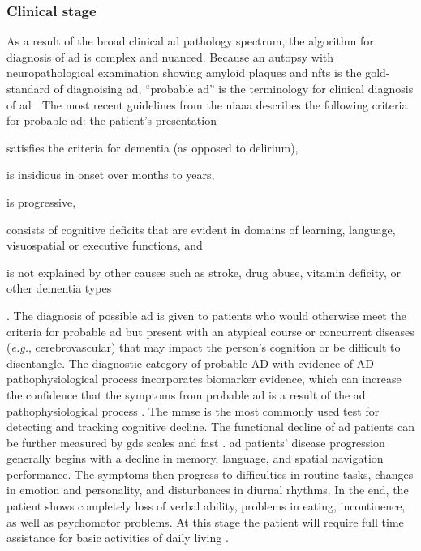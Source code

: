 \subsubsection{Clinical stage}

As a result of the broad clinical \gls{ad} pathology spectrum, the algorithm for diagnosis of \gls{ad} is complex and nuanced. Because an autopsy with neuropathological examination showing amyloid plaques and \gls{nft}s is the gold-standard of diagnoising \gls{ad}, ``probable \gls{ad}'' is the terminology for clinical diagnosis of \gls{ad} \citep{hyman12}. The most recent guidelines from the \gls{niaaa} describes the following criteria for probable \gls{ad}: the patient's presentation 
\begin{enumerate*}[label={\alph*)}, font={\bfseries}]
    \item satisfies the criteria for dementia (as opposed to delirium), 
    \item is insidious in onset over months to years, 
    \item is progressive,
    \item consists of cognitive deficits that are evident in domains of learning, language, visuospatial or executive functions, and 
    \item is not explained by other causes such as stroke, drug abuse, vitamin deficity, or other dementia types
\end{enumerate*} \citep{mckhann11}.
The diagnosis of possible \gls{ad} is given to patients who would otherwise meet the criteria for probable \gls{ad} but present with an atypical course or concurrent diseases (\textit{e.g.}, cerebrovascular) that may impact the person's cognition or be difficult to disentangle. The diagnostic category of probable AD with evidence of AD pathophysiological process incorporates biomarker evidence, which can increase the confidence that the symptoms from probable \gls{ad} is a result of the \gls{ad} pathophysiological process \citep{mckhann11}. 
The \gls{mmse} is the most commonly used test for detecting and tracking cognitive decline. The functional decline of \gls{ad} patients can be further measured by \gls{gds} scales \citep{reisberg82} and \gls{fast} \citep{sclan92}. \gls{ad} patients' disease progression generally begins with a decline in memory, language, and spatial navigation performance. The symptoms then progress to difficulties in routine tasks, changes in emotion and personality, and disturbances in diurnal rhythms. In the end, the patient shows completely loss of verbal ability, problems in eating, incontinence, as well as psychomotor problems. At this stage the patient will require full time assistance for basic activities of daily living \citep{reisberg82, sclan92}.

